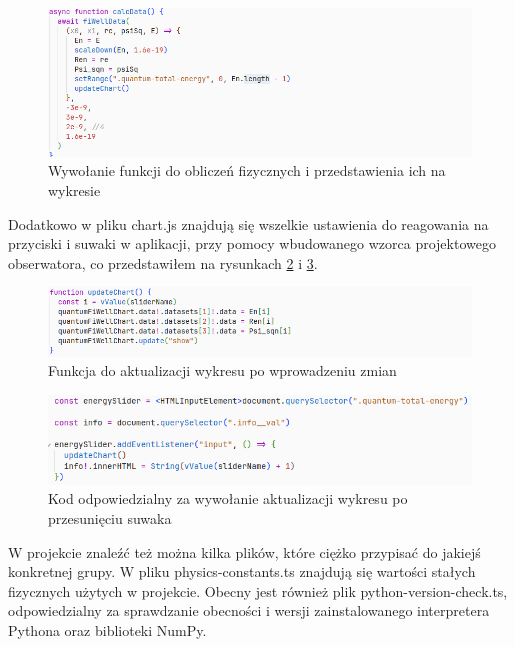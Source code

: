\documentclass{SGGW-thesis}
\begin{document}
	\begin{figure}[H]
	\includegraphics[width=\textwidth,height=\textheight,keepaspectratio]{calc data.png} 
	\caption{Wywołanie funkcji do obliczeń fizycznych i przedstawienia ich na wykresie}
	\label{fig:calc-data}
	\end{figure}
	
	Dodatkowo w pliku chart.js znajdują się wszelkie ustawienia do reagowania na przyciski i suwaki w aplikacji, przy pomocy wbudowanego wzorca projektowego obserwatora, co przedstawiłem na rysunkach \ref{fig:update-chart} i \ref{fig:slider-change}.
	
	\begin{figure}[H]
	\includegraphics[width=\textwidth,height=\textheight,keepaspectratio]{update chart.png} 
	\caption{Funkcja do aktualizacji wykresu po wprowadzeniu zmian}
	\label{fig:update-chart}
	\end{figure}
	
	\begin{figure}[H]
	\includegraphics[width=\textwidth,height=\textheight,keepaspectratio]{slider change.png} 
	\caption{Kod odpowiedzialny za wywołanie aktualizacji wykresu po przesunięciu suwaka}
	\label{fig:slider-change}
	\end{figure}
	
	W projekcie znaleźć też można kilka plików, które ciężko przypisać do jakiejś konkretnej grupy. W pliku physics-constants.ts znajdują się wartości stałych fizycznych użytych w projekcie. Obecny jest również plik python-version-check.ts, odpowiedzialny za sprawdzanie obecności i wersji zainstalowanego interpretera Pythona oraz biblioteki NumPy.
	
\end{document}
